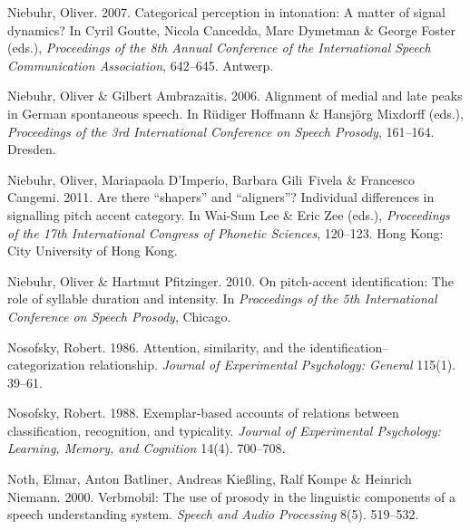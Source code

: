 \documentclass[ number=1
,series=labphon
,output=long
,url=http://langsci-press.org/catalog/book/16
,isbn=978-3-944675-01-5
]{LSP/langsci}
\begin{document}
\begin{thebibliography}{284}
\enlargethispage{\baselineskip}
Niebuhr, Oliver. 2007.
\newblock Categorical perception in intonation: {A} matter of signal dynamics?
\newblock In Cyril Goutte, Nicola Cancedda, Marc Dymetman \& George Foster
  (eds.), \emph{Proceedings of the 8th {Annual Conference of the International
  Speech Communication Association}}, 642--645. Antwerp.

Niebuhr, Oliver \& Gilbert Ambrazaitis. 2006.
\newblock Alignment of medial and late peaks in {G}erman spontaneous speech.
\newblock In Rüdiger Hoffmann \& Hansjörg Mixdorff (eds.), \emph{Proceedings
  of the 3rd {I}nternational {C}onference on {S}peech {P}rosody}, 161--164.
  Dresden.

Niebuhr, Oliver, Mariapaola D'Imperio, Barbara Gili~Fivela \& Francesco
  Cangemi. 2011.
\newblock Are there ``shapers'' and ``aligners''? {I}ndividual differences in
  signalling pitch accent category.
\newblock In Wai-Sum Lee \& Eric Zee (eds.), \emph{Proceedings of the 17th
  {I}nternational {C}ongress of {P}honetic {S}ciences}, 120--123. Hong Kong:
  City University of Hong Kong.

Niebuhr, Oliver \& Hartmut Pfitzinger. 2010.
\newblock On pitch-accent identification: {T}he role of syllable duration and
  intensity.
\newblock In \emph{Proceedings of the 5th {I}nternational {C}onference on
  {S}peech {P}rosody}, Chicago.

Nosofsky, Robert. 1986.
\newblock Attention, similarity, and the identification--categorization
  relationship.
\newblock \emph{Journal of Experimental Psychology: General} 115(1). 39--61.

Nosofsky, Robert. 1988.
\newblock Exemplar-based accounts of relations between classification,
  recognition, and typicality.
\newblock \emph{Journal of Experimental Psychology: Learning, Memory, and
  Cognition} 14(4). 700--708.

Noth, Elmar, Anton Batliner, Andreas Kie\ss{}ling, Ralf Kompe \& Heinrich
  Niemann. 2000.
\newblock Verbmobil: {T}he use of prosody in the linguistic components of a
  speech understanding system.
\newblock \emph{Speech and Audio Processing} 8(5). 519--532.


\end{thebibliography}
\end{document}
